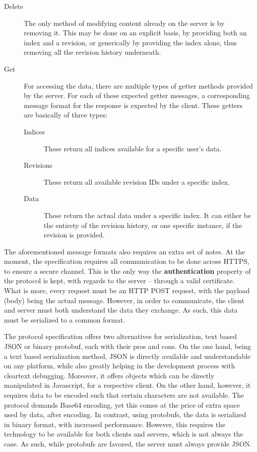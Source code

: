 \begin{description}
\begin{description}
    \item[Delete] The only method of modifying content already on the server is by removing it.
    This may be done on an explicit basis, by providing both an index and a revision, or generically by providing the index alone, thus removing all the revision history underneath.

    \item[Get] For accessing the data, there are multiple types of getter methods provided by the server.
    For each of these expected getter messages, a corresponding message format for the response is expected by the client.
    These getters are basically of three types:
    \begin{description}
      \item[Indices] These return all indices available for a specific user's data.
      \item[Revisions] These return all available revision IDs under a specific index.
      \item[Data] These return the actual data under a specific index.
      It can either be the entirety of the revision history, or one specific instance, if the revision is provided.
    \end{description}
  \end{description}
\end{description}

The aforementioned message formats also requires an extra set of notes.
At the moment, the specification requires all communication to be done across HTTPS, to ensure a secure channel.
This is the only way the \textbf{authentication} property of the protocol is kept, with regards to the server -- through a valid certificate.
What is more, every request must be an HTTP POST request, with the payload (body) being the actual message.
However, in order to communicate, the client and server must both understand the data they exchange.
As such, this data must be serialized to a common format.

The protocol specification offers two alternatives for serialization, text based JSON or binary protobuf, each with their pros and cons.
On the one hand, being a text based serialization method, JSON is directly available and understandable on any platform, while also greatly helping in the development process with cleartext debugging.
Moreover, it offers objects which can be directly manipulated in Javascript, for a respective client.
On the other hand, however, it requires data to be encoded such that certain characters are not available.
The protocol demands Base64 encoding, yet this comes at the price of extra space used by data, after encoding.
In contrast, using protobufs, the data is serialized in binary format, with increased performance.
However, this requires the technology to be available for both clients and servers, which is not always the case.
As such, while protobufs are favored, the server must always provide JSON.

